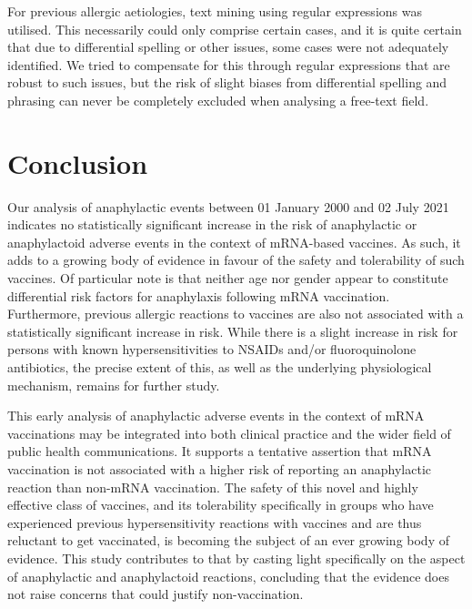 \documentclass{article}
\begin{document}
For previous allergic aetiologies, text mining using regular expressions was utilised.
This necessarily could only comprise certain cases, and it is quite certain that due to differential spelling or other issues, some cases were not adequately identified.
We tried to compensate for this through regular expressions that are robust to such issues, but the risk of slight biases from differential spelling and phrasing can never be completely excluded when analysing a free-text field.

\section{Conclusion}

Our analysis of anaphylactic events between 01 January 2000 and 02 July 2021 indicates no statistically significant increase in the risk of anaphylactic or anaphylactoid adverse events in the context of mRNA-based vaccines.
As such, it adds to a growing body of evidence in favour of the safety and tolerability of such vaccines.\cite{chu2021preliminary,baden2021efficacy,anderson2020safety}
Of particular note is that neither age nor gender appear to constitute differential risk factors for anaphylaxis following mRNA vaccination.
Furthermore, previous allergic reactions to vaccines are also not associated with a statistically significant increase in risk.
While there is a slight increase in risk for persons with known hypersensitivities to NSAIDs and/or fluoroquinolone antibiotics, the precise extent of this, as well as the underlying physiological mechanism, remains for further study.

This early analysis of anaphylactic adverse events in the context of mRNA vaccinations may be integrated into both clinical practice and the wider field of public health communications.
It supports a tentative assertion that mRNA vaccination is not associated with a higher risk of reporting an anaphylactic reaction than non-mRNA vaccination.
The safety of this novel and highly effective class of vaccines, and its tolerability specifically in groups who have experienced previous hypersensitivity reactions with vaccines and are thus reluctant to get vaccinated, is becoming the subject of an ever growing body of evidence.
This study contributes to that by casting light specifically on the aspect of anaphylactic and anaphylactoid reactions, concluding that the evidence does not raise concerns that could justify non-vaccination.

\vspace{6pt}
\end{document}
